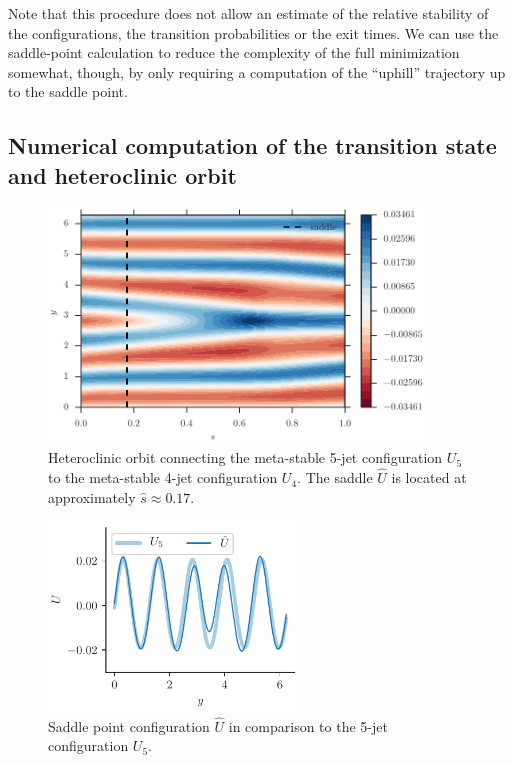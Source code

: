 \documentclass[12pt]{amsart}
\begin{document}
Note that this procedure does not allow an estimate of the relative
stability of the configurations, the transition probabilities or the
exit times. We can use the saddle-point calculation to reduce the
complexity of the full minimization somewhat, though, by only
requiring a computation of the ``uphill'' trajectory up to the saddle
point.

\subsection{Numerical computation of the transition state and heteroclinic orbit}

\begin{figure}[t]
  \begin{center}
    \includegraphics[width=0.9\textwidth]{figures/merger-5-to-4-string}
  \end{center}
  \caption{Heteroclinic orbit connecting the meta-stable 5-jet
    configuration $U_5$ to the meta-stable 4-jet configuration
    $U_4$. The saddle $\hat U$ is located at approximately $\hat
    s\approx0.17$.\label{fig:merger-4-to-5-string}}
\end{figure}

\begin{figure}[t]
  \begin{center}
    \includegraphics[width=0.6\textwidth]{figures/merger-5-to-4-saddle}
  \end{center}
  \caption{Saddle point configuration $\hat U$ in comparison to the
    5-jet configuration $U_5$.\label{fig:merger-4-to-5-saddle}}
\end{figure}
\end{document}
